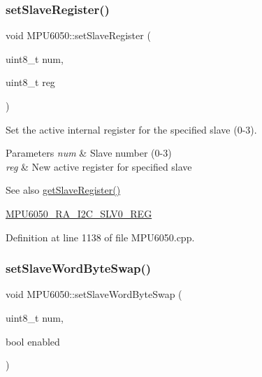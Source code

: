 \subsubsection{\texorpdfstring{setSlaveRegister()}{setSlaveRegister()}}
{\footnotesize\ttfamily void M\+P\+U6050\+::set\+Slave\+Register (\begin{DoxyParamCaption}\item[{uint8\+\_\+t}]{num,  }\item[{uint8\+\_\+t}]{reg }\end{DoxyParamCaption})}

Set the active internal register for the specified slave (0-\/3). 
\begin{DoxyParams}{Parameters}
{\em num} & Slave number (0-\/3) \\
\hline
{\em reg} & New active register for specified slave \\
\hline
\end{DoxyParams}
\begin{DoxySeeAlso}{See also}
\mbox{\hyperlink{classMPU6050_ae7e9ead9645bcef326eb579c6ab5d5ff}{get\+Slave\+Register()}} 

\mbox{\hyperlink{MPU6050_8h_ae9fc1bc0eb0c568846328de91127ca80}{M\+P\+U6050\+\_\+\+R\+A\+\_\+\+I2\+C\+\_\+\+S\+L\+V0\+\_\+\+R\+EG}} 
\end{DoxySeeAlso}


Definition at line 1138 of file M\+P\+U6050.\+cpp.


\begin{DoxyCode}{0}

\end{DoxyCode}
\mbox{\label{classMPU6050_abeb1f83652066d7543fd3283af794364}} 
\subsubsection{\texorpdfstring{setSlaveWordByteSwap()}{setSlaveWordByteSwap()}}
{\footnotesize\ttfamily void M\+P\+U6050\+::set\+Slave\+Word\+Byte\+Swap (\begin{DoxyParamCaption}\item[{uint8\+\_\+t}]{num,  }\item[{bool}]{enabled }\end{DoxyParamCaption})}

